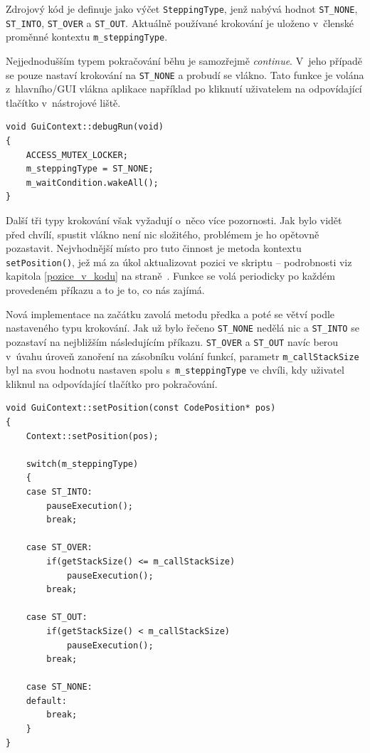 \documentclass[11pt,twoside,a4paper]{book}
\begin{document}
Zdrojový kód je definuje jako výčet \texttt{SteppingType}, jenž nabývá hodnot \texttt{ST\_NONE}, \texttt{ST\_INTO}, \texttt{ST\_OVER} a \texttt{ST\_OUT}. Aktuálně používané krokování je uloženo v~členské proměnné kontextu \texttt{m\_step\-ping\-Type}.

Nejjednodušším typem pokračování běhu je samozřejmě \textit{continue}. V~jeho případě se pouze nastaví krokování na \texttt{ST\_NONE} a probudí se vlákno. Tato funkce je volána z~hlavního/GUI vlákna aplikace například po kliknutí uživatelem na odpovídající tlačítko v~nástrojové liště.

\begin{verbatim}
void GuiContext::debugRun(void)
{
    ACCESS_MUTEX_LOCKER;
    m_steppingType = ST_NONE;
    m_waitCondition.wakeAll();
}
\end{verbatim}

Další tři typy krokování však vyžadují o~něco více pozornosti. Jak bylo vidět před chvílí, spustit vlákno není nic složitého, problémem je ho opětovně pozastavit. Nejvhodnější místo pro tuto činnost je metoda kontextu \texttt{setPosition()}, jež má za úkol aktualizovat pozici ve skriptu -- podrobnosti viz kapitola \ref{pozice_v_kodu} na straně~\pageref{pozice_v_kodu}. Funkce se volá periodicky po každém provedeném příkazu a to je to, co nás zajímá.

Nová implementace na začátku zavolá metodu předka a poté se větví podle nastaveného typu krokování. Jak už bylo řečeno \texttt{ST\_NONE} nedělá nic a \texttt{ST\_INTO} se pozastaví na nejbližším následujícím příkazu. \texttt{ST\_OVER} a \texttt{ST\_OUT} navíc berou v~úvahu úroveň zanoření na zásobníku volání funkcí, parametr \texttt{m\_callStackSize} byl na svou hodnotu nastaven spolu s~\texttt{m\_steppingType} ve chvíli, kdy uživatel kliknul na odpovídající tlačítko pro pokračování.

\begin{verbatim}
void GuiContext::setPosition(const CodePosition* pos)
{
    Context::setPosition(pos);

    switch(m_steppingType)
    {
    case ST_INTO:
        pauseExecution();
        break;

    case ST_OVER:
        if(getStackSize() <= m_callStackSize)
            pauseExecution();
        break;

    case ST_OUT:
        if(getStackSize() < m_callStackSize)
            pauseExecution();
        break;

    case ST_NONE:
    default:
        break;
    }
}
\end{verbatim}
\end{document}
